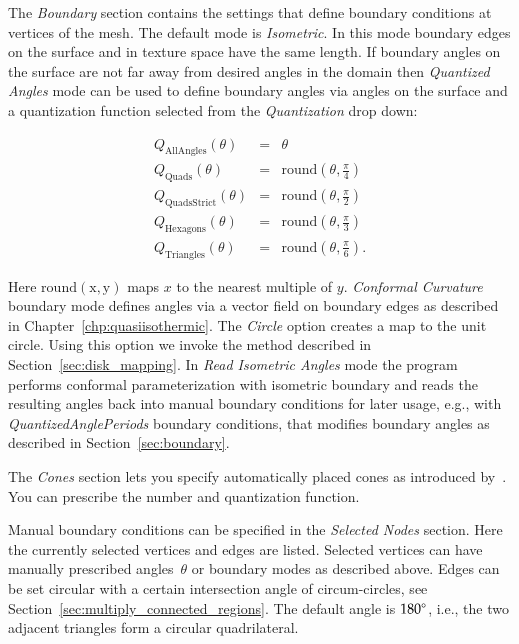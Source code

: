 \documentclass[Thesis.tex]{subfiles}
\begin{document}
The \emph{Boundary} section contains the settings that define boundary conditions at vertices of the mesh. 
The default mode is \emph{Isometric}. In this mode boundary edges on the surface and in texture space have the same length. If boundary angles on the surface are not far away from desired angles in the domain then \emph{Quantized Angles} mode can be used to define boundary angles via angles on the surface and a quantization function selected from the \emph{Quantization} drop down:

\begin{eqnarray*}
	Q_{\mathrm{AllAngles}}(\theta) &=& \theta \\
	Q_{\mathrm{Quads}}(\theta) &=& \mathrm{round}\left(\theta, \frac{\pi}{4}\right) \\
	Q_{\mathrm{QuadsStrict}}(\theta) &=& \mathrm{round}\left(\theta, \frac{\pi}{2}\right) \\
	Q_{\mathrm{Hexagons}}(\theta) &=& \mathrm{round}\left(\theta, \frac{\pi}{3}\right) \\
	Q_{\mathrm{Triangles}}(\theta) &=& \mathrm{round}\left(\theta, \frac{\pi}{6}\right).
\end{eqnarray*}

Here $\mathrm{round(x,y)}$ maps $x$ to the nearest multiple of $y$.
\emph{Conformal Curvature} boundary mode defines angles via a vector field on boundary edges as described in Chapter~\ref{chp:quasiisothermic}. The \emph{Circle} option creates a map to the unit circle. Using this option we invoke the method described in Section~\ref{sec:disk_mapping}. 
In \emph{Read Isometric Angles} mode the program performs conformal parameterization with isometric boundary and reads the resulting angles back into manual boundary conditions for later usage, e.g., with \emph{QuantizedAnglePeriods} boundary conditions, that modifies boundary angles as described in Section~\ref{sec:boundary}.

The \emph{Cones} section lets you specify automatically placed cones as introduced by~\cite{Springborn2008SIGGRAPH}. You can prescribe the number and quantization function.

Manual boundary conditions can be specified in the \emph{Selected Nodes} section. Here the currently selected vertices and edges are listed. Selected vertices can have manually prescribed angles~$\theta$ or boundary modes as described above. Edges can be set circular with a certain intersection angle of circum-circles, see Section~\ref{sec:multiply_connected_regions}. The default angle is $180\degree$, i.e., the two adjacent triangles form a circular quadrilateral.
\end{document}
